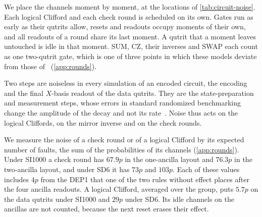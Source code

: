 We place the channels moment by moment, at the locations of \autoref{tab:circuit-noise}. Each logical Clifford and each check round is scheduled on its own. Gates run as early as their qutrits allow, resets and readouts occupy moments of their own, and all readouts of a round share its last moment. A qutrit that a moment leaves untouched is idle in that moment. SUM, CZ, their inverses and SWAP each count as one two-qutrit gate, which is one of three points in which these models deviate from those of~\cite{GidneyHoneycomb2021} (\autoref{app:rounds}).

Two steps are noiseless in every simulation of an encoded circuit, the encoding and the final $X$-basis readout of the data qutrits. They are the state-preparation and measurement steps, whose errors in standard randomized benchmarking change the amplitude of the decay and not its rate~\cite{Magesan2011PRL,Magesan2012PRA}. Noise thus acts on the logical Cliffords, on the mirror inverse and on the check rounds.

We measure the noise of a check round or of a logical Clifford by its expected number of faults, the sum of the probabilities of its channels (\autoref{app:rounds}). Under SI1000 a check round has $67.9p$ in the one-ancilla layout and $76.3p$ in the two-ancilla layout, and under SD6 it has $73p$ and $103p$. Each of these values includes $4p$ from the DEP1 that one of the two rules without effect places after the four ancilla readouts. A logical Clifford, averaged over the group, puts $5.7p$ on the data qutrits under SI1000 and $29p$ under SD6. Its idle channels on the ancillas are not counted, because the next reset erases their effect.

